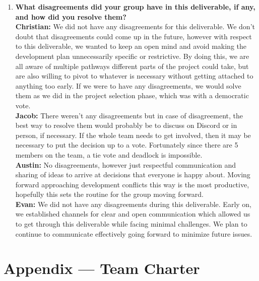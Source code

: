 \documentclass{article}
\begin{document}
\begin{enumerate}
  \item \textbf{What disagreements did your group have in this deliverable, if any, and how did you resolve them?}\\

  \textbf{Christian:} We did not have any disagreements for this deliverable. We don't doubt that disagreements could come up in the future, however with respect to this deliverable, we wanted to keep an open mind and avoid making the development plan unnecessarily specific or restrictive. By doing this, we are all aware of multiple pathways different parts of the project could take, but are also willing to pivot to whatever is necessary without getting attached to anything too early. If we were to have any disagreements, we would solve them as we did in the project selection phase, which was with a democratic vote.\\

  \textbf{Jacob:}  There weren’t any disagreements but in case of disagreement, the best way to resolve them would probably be to discuss on Discord or in person, if necessary. If the whole team needs to get involved, then it may be necessary to put the decision up to a vote. Fortunately since there are 5 members on the team, a tie vote and deadlock is impossible.\\

  \textbf{Austin:} No disagreements, however just respectful communication and sharing of ideas to arrive at decisions that everyone is happy about. Moving forward approaching development conflicts this way is the most productive, hopefully this sets the routine for the group moving forward.\\

  \textbf{Evan:} We did not have any disagreements during this deliverable. Early on, we established channels for clear and open communication which allowed us to get through this deliverable while facing minimal challenges. We plan to continue to communicate effectively going forward to minimize future issues.

\end{enumerate}

\newpage{}

\section*{Appendix --- Team Charter}

\end{document}
